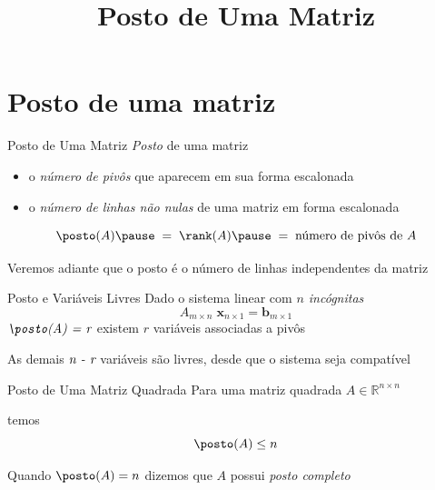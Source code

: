 \documentclass[fleqn,aspectratio=169,12pt]{beamer}
\title{Posto de Uma Matriz}
\begin{document}
\addtitle

\section{Posto de uma matriz}

\begin{frame}{Posto de Uma Matriz}
  \emph{Posto} de uma matriz
  \pause
  \begin{itemize}
    \item o \emph{número de pivôs} que aparecem em sua forma escalonada
    \pause
    \item o \emph{número de linhas não nulas} de uma matriz em forma escalonada
  \end{itemize}

  \pause
  \medskip
  \[
    \posto(A)
    \pause
    \;=\;
    \rank(A)
    \pause
    \;=\;
    \text{número de pivôs de }A
  \]

  \pause
  \medskip
  Veremos adiante que o posto é o número de linhas independentes da matriz
\end{frame}




\begin{frame}{Posto e Variáveis Livres}
  Dado o sistema linear com \emph{$n$ incógnitas}
  \[
    A_{m\times n} \; \mathbf{x}_{n\times 1} = \mathbf{b}_{m\times 1}
  \]
  \pause
  \(
    \emph{\posto(A) = r}
  \)\;
  \pause
  existem $r$ variáveis associadas a pivôs

  \medskip
  \pause
  As demais
  \(
    \emph{n - r}
  \)
  variáveis são livres,
  \pause
  desde que o sistema seja compatível
\end{frame}



\begin{frame}{Posto de Uma Matriz Quadrada}
  Para uma matriz quadrada
  \(
    A\in\mathbb{R}^{n\times n}
  \)

  \pause
  temos
  \[
    \posto(A) \leq n
  \]

  \pause
  \bigskip
  Quando
  \;\(
    \posto(A) = n
  \)\;
  \pause
  dizemos que $A$ possui \emph{posto completo}
\end{frame}
\end{document}

